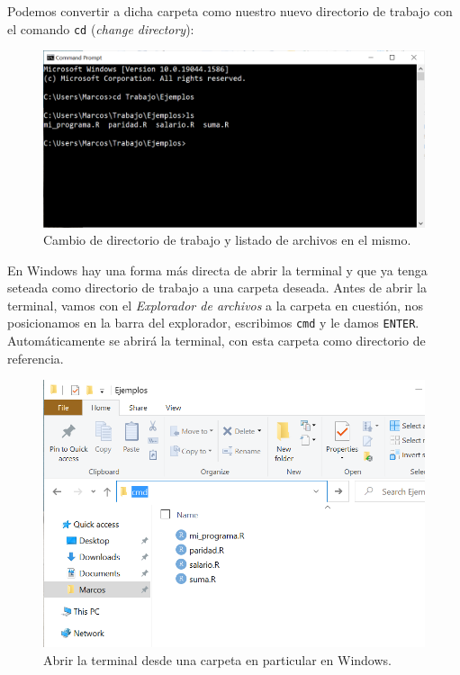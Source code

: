 \documentclass[
]{book}
\begin{document}
Podemos convertir a dicha carpeta como nuestro nuevo directorio de trabajo con el comando \texttt{cd} (\emph{change directory}):

\begin{figure}

{\centering \includegraphics[width=0.8\linewidth]{images/07_otros/terminal5} 

}

\caption{Cambio de directorio de trabajo y listado de archivos en el mismo.}\label{fig:unnamed-chunk-283}
\end{figure}

En Windows hay una forma más directa de abrir la terminal y que ya tenga seteada como directorio de trabajo a una carpeta deseada. Antes de abrir la terminal, vamos con el \emph{Explorador de archivos} a la carpeta en cuestión, nos posicionamos en la barra del explorador, escribimos \texttt{cmd} y le damos \texttt{ENTER}. Automáticamente se abrirá la terminal, con esta carpeta como directorio de referencia.

\begin{figure}

{\centering \includegraphics[width=0.8\linewidth]{images/07_otros/terminal6} 

}

\caption{Abrir la terminal desde una carpeta en particular en Windows.}\label{fig:unnamed-chunk-284}
\end{figure}
\end{document}
